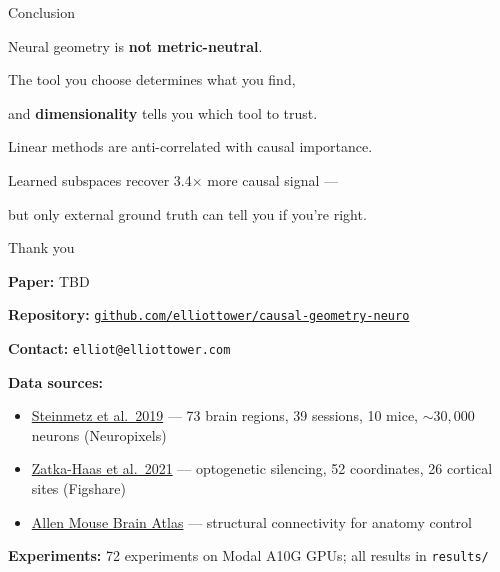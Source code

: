 \documentclass[aspectratio=169,11pt]{beamer}
\begin{document}
\begin{frame}{Conclusion}

\begin{center}
\vspace{0.5em}
{\Large Neural geometry is \textbf{not metric-neutral}.}

\vspace{0.6em}

{\Large The tool you choose determines what you find,}

\vspace{0.2em}

{\Large and \textbf{dimensionality} tells you which tool to trust.}

\vspace{1.2em}

{\small Linear methods are anti-correlated with causal importance.}

\vspace{0.2em}

{\small Learned subspaces recover 3.4$\times$ more causal signal ---}

\vspace{0.1em}

{\small but only external ground truth can tell you if you're right.}
\end{center}
\end{frame}

\begin{frame}{Thank you}

\textbf{Paper:} TBD

\vspace{0.3em}
\textbf{Repository:} \href{https://github.com/elliottower/causal-geometry-neuro}{\texttt{github.com/elliottower/causal-geometry-neuro}}

\vspace{0.3em}
\textbf{Contact:} \texttt{elliot@elliottower.com}

\vspace{0.3em}
{\small
\textbf{Data sources:}
\begin{itemize}\setlength\itemsep{0pt}
  \item \href{https://doi.org/10.1038/s41586-019-1787-x}{Steinmetz et al.\ 2019} --- 73 brain regions, 39 sessions, 10 mice, ${\sim}30{,}000$ neurons (Neuropixels)
  \item \href{https://doi.org/10.7554/eLife.63163}{Zatka-Haas et al.\ 2021} --- optogenetic silencing, 52 coordinates, 26 cortical sites (Figshare)
  \item \href{https://connectivity.brain-map.org/}{Allen Mouse Brain Atlas} --- structural connectivity for anatomy control
\end{itemize}

\textbf{Experiments:} 72 experiments on Modal A10G GPUs; all results in \texttt{results/}
}
\end{frame}
\end{document}
